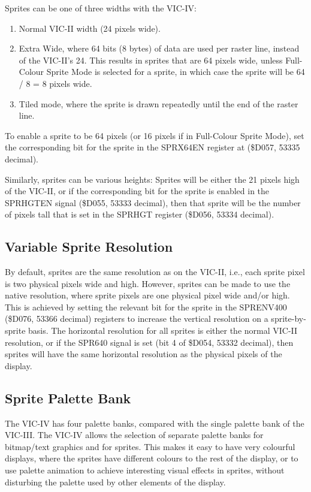 Sprites can be one of three widths with the VIC-IV:

\begin{enumerate}
\item Normal VIC-II width (24 pixels wide).
\item Extra Wide, where 64 bits (8 bytes) of data are used per raster line, instead of the VIC-II's 24.
  This results in sprites that are 64 pixels wide, unless Full-Colour Sprite Mode is selected for a sprite,
  in which case the sprite will be 64 / 8 = 8 pixels wide.
\item Tiled mode, where the sprite is drawn repeatedly until the end of the raster line.
\end{enumerate}

To enable a sprite to be 64 pixels (or 16 pixels if in Full-Colour Sprite Mode), set the corresponding bit for the sprite in the SPRX64EN register at (\$D057, 53335 decimal).

Similarly, sprites can be various heights:  Sprites will be either the 21 pixels high of the VIC-II, or if the corresponding bit for the sprite is enabled in the SPRHGTEN signal (\$D055, 53333 decimal), then that sprite will be the number of pixels tall that is set in the SPRHGT
register (\$D056, 53334 decimal).

\subsection{Variable Sprite Resolution}

By default, sprites are the same resolution as on the VIC-II, i.e., each sprite pixel is two physical pixels wide and high.
However, sprites can be made to use the native resolution, where sprite pixels are one physical pixel wide and/or high.
This is achieved by setting the relevant bit for the sprite in the SPRENV400 (\$D076, 53366 decimal) registers to increase the
vertical resolution on a sprite-by-sprite basis.  The horizontal resolution for all sprites is either the normal VIC-II resolution, or if the SPR640 signal
is set (bit 4 of \$D054, 53332 decimal), then sprites will have the same horizontal resolution as the physical pixels of the display.

\subsection{Sprite Palette Bank}

The VIC-IV has four palette banks, compared with the single palette bank of the VIC-III.
The VIC-IV allows the selection of separate palette banks for bitmap/text graphics and for sprites.  This makes it easy to have
very colourful displays, where the sprites have different colours to the rest of the display, or to use palette animation to achieve
interesting visual effects in sprites, without disturbing the palette used by other elements of the display.

